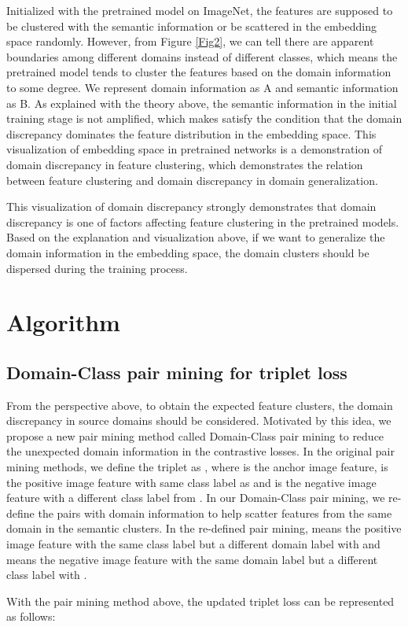 \documentclass[a4paper,fleqn]{cas-dc}
\begin{document}
 Initialized with the pretrained model on ImageNet, the features are supposed to be clustered with the semantic information or be scattered in the embedding space randomly. However, from Figure \ref{Fig2}, we can tell there are apparent boundaries among different domains instead of different classes, which means the pretrained model tends to cluster the features based on the domain information to some degree. We represent domain information as A and semantic information as B. As explained with the theory above, the semantic information in the initial training stage is not amplified, which makes  satisfy the condition that the domain discrepancy dominates the feature distribution in the embedding space. This visualization of embedding space in pretrained networks is a demonstration of domain discrepancy in feature clustering, which demonstrates the relation between feature clustering and domain discrepancy in domain generalization. 
 
This visualization of domain discrepancy strongly demonstrates that domain discrepancy is one of factors affecting feature clustering in the pretrained models. Based on the explanation and visualization above, if we want to generalize the domain information in the embedding space, the domain clusters should be dispersed during the training process.
 \section{Algorithm}
\label{sec: Algorithm}

\subsection{Domain-Class pair mining for triplet loss}
From the perspective above, to obtain the expected feature clusters, the domain discrepancy in source domains should be considered. Motivated by this idea, we propose a new pair mining method called Domain-Class pair mining to reduce the unexpected domain information in the contrastive losses. In the original pair mining methods, we define the triplet as , where  is the anchor image feature,  is the positive image feature with same class label as  and  is the negative image feature with a different class label from . In our Domain-Class pair mining, we re-define the pairs with domain information to help scatter features from the same domain in the semantic clusters. In the re-defined pair mining,  means the positive image feature with the same class label  but a different domain label with  and  means the negative image feature with the same domain label but a different class label with . \par
With the pair mining method above, the updated triplet loss can be represented as follows:
\end{document}
